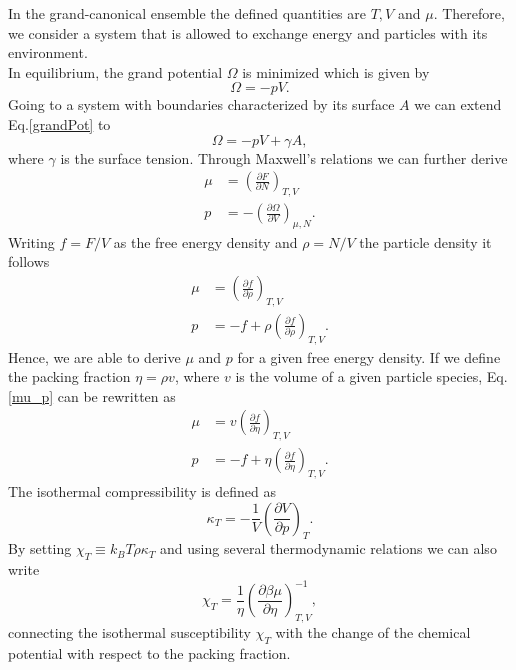 \documentclass{article}
\begin{document}
In the grand-canonical ensemble the defined quantities are $T, V$ and $\mu$. Therefore, we consider a system that is allowed to exchange energy and particles with its environment.\\
In equilibrium, the grand potential $\Omega$ is minimized which is given by
\begin{equation}\label{grandPot}
	\Omega = -pV.
\end{equation}
Going to a system with boundaries characterized by its surface $A$ we can extend Eq.\eqref{grandPot} to 
\begin{equation}
	\Omega = -pV + \gamma A,
\end{equation}
where $\gamma$ is the surface tension. Through Maxwell's relations we can further derive
\begin{align}
	\mu &= \left(\frac{\partial F}{\partial N}\right)_{T,V}\\\nonumber
	p &= -\left(\frac{\partial \Omega}{\partial V}\right)_{\mu,N}.
\end{align}
Writing $f=F/V$ as the free energy density and $\rho = N/V$ the particle density it follows
\begin{align}\label{mu_p}
	\mu &= \left(\frac{\partial f}{\partial \rho}\right)_{T,V}\\\nonumber
	p &= -f + \rho \left(\frac{\partial f}{\partial \rho}\right)_{T,V}.
\end{align}
Hence, we are able to derive $\mu$ and $p$ for a given free energy density. If we define the packing fraction $\eta = \rho v$, where $v$ is the volume of a given particle species, Eq.\eqref{mu_p} can be rewritten as
\begin{align}\label{mu_p_eta}
	\mu &= v \left(\frac{\partial f}{\partial \eta}\right)_{T,V}\\\nonumber
	p &= -f + \eta \left(\frac{\partial f}{\partial \eta}\right)_{T,V}.
\end{align}
The isothermal compressibility is defined as
\begin{equation}
	\kappa_T = -\frac{1}{V}\left(\frac{\partial V}{\partial p}\right)_{T}.
\end{equation}
By setting $\chi_T\equiv k_B T\rho \kappa_T$ and using several thermodynamic relations we can also write
\begin{equation}\label{isoComp}
	\chi_T = \frac{1}{\eta}\left(\frac{\partial\beta\mu}{\partial\eta}\right)^{-1}_{T,V},
\end{equation}
connecting the isothermal susceptibility $\chi_T$ with the change of the chemical potential with respect to the packing fraction.\\
\end{document}
